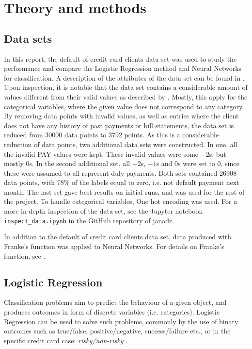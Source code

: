 \section{Theory and methods}
\label{sec:theory}

\subsection{Data sets}
\label{sec:datasets}
In this report, the default of credit card clients data set \citep{yeh2009UCI} was used to study the performance and compare the Logistic Regression method and Neural Networks for classification. A description of the attributes of the data set can be found in \cite{yeh2009UCI}. Upon inspection, it is notable that the data set contains a considerable amount of values different from their valid values as described by \citeauthor{yeh2009UCI}. Mostly, this apply for the categorical variables, where the given value does not correspond to any category. By removing data points with invalid values, as well as entries where the client does not have any history of past payments or bill statements, the data set is reduced from 30000 data points to 3792 points. As this is a considerable reduction of data points, two additional data sets were constructed. In one, all the invalid PAY values were kept. These invalid values were some $-2$s, but mostly $0$s. In the second additional set, all $-2$s, $-1$s and $0$s were set to $0$, since these were assumed to all represent duly payments. Both sets contained 26908 data points, with 78\% of the labels equal to zero, i.e. not default payment next month. The last set gave best results on initial runs, and was used for the rest of the project. To handle categorical variables, One hot encoding was used. For a more in-depth inspection of the data set, see the Jupyter notebook \texttt{inspect\_data.ipynb} in the \href{https://github.com/janadr/FYS-STK4155/tree/master/project2}{GitHub repository} of janadr.

In addition to the default of credit card clients data set, data produced with Franke's function was applied to Neural Networks. For details on Franke's function, see \cite{prosjekt1}.

\subsection{Logistic Regression}
Classification problems aim to predict the behaviour of a given object, and produces outcomes in form of discrete variables (i.e. categories). Logistic Regression can be used to solve such problems, commonly by the use of binary outcomes such as true/false, positive/negative, success/failure etc., or in the specific credit card case: \textit{risky/non-risky} \cite{LogRegLectures}. 

